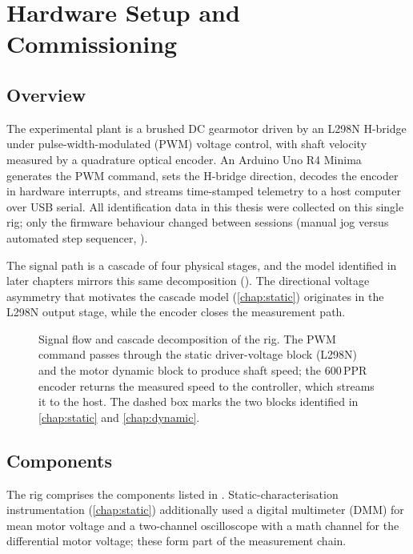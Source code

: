 \chapter{Hardware Setup and Commissioning}
\label{chap:hardware}

\section{Overview}
\label{sec:overview}

The experimental plant is a brushed DC gearmotor driven by an L298N H-bridge under pulse-width-modulated (PWM) voltage control, with shaft velocity measured by a quadrature optical encoder. An Arduino Uno R4 Minima generates the PWM command, sets the H-bridge direction, decodes the encoder in hardware interrupts, and streams time-stamped telemetry to a host computer over USB serial. All identification data in this thesis were collected on this single rig; only the firmware behaviour changed between sessions (manual jog versus automated step sequencer, ).

The signal path is a cascade of four physical stages, and the model identified in later chapters mirrors this same decomposition (). The directional voltage asymmetry that motivates the cascade model (\cref{chap:static}) originates in the L298N output stage, while the encoder closes the measurement path.

\begin{figure}[t]
  \centering
  \resizebox{\textwidth}{!}{}
  \caption{Signal flow and cascade decomposition of the rig. The PWM command passes through the static driver-voltage block (L298N) and the motor dynamic block to produce shaft speed; the 600\,PPR encoder returns the measured speed to the controller, which streams it to the host. The dashed box marks the two blocks identified in \cref{chap:static} and \cref{chap:dynamic}.}
  \label{fig:blockdiagram}
\end{figure}

\section{Components}
\label{sec:components}

The rig comprises the components listed in . Static-characterisation instrumentation (\cref{chap:static}) additionally used a digital multimeter (DMM) for mean motor voltage and a two-channel oscilloscope with a math channel for the differential motor voltage; these form part of the measurement chain.

